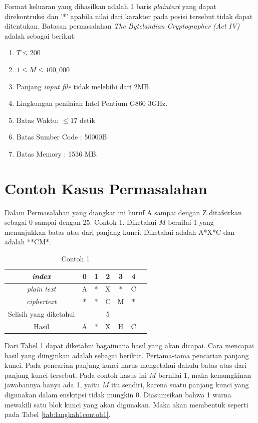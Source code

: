 	
	Format keluaran yang dihasilkan adalah 1 baris \textit{plaintext} yang dapat direkontruksi dan '*' apabila nilai dari karakter pada posisi tersebut tidak dapat ditentukan. 
	Batasan permasalahan \textit{The Bytelandian Cryptographer (Act IV)} adalah sebagai berikut:
	\begin{enumerate}
		\item $T \leq 200$
		\item $1 \leq M \leq 100,000$
		\item Panjang \textit{input file} tidak melebihi dari 2MB.
		\item Lingkungan penilaian Intel Pentium G860 3GHz.
		\item Batas Waktu: $\leq17$ detik
		\item Batas Sumber Code : 50000B
		\item Batas Memory : 1536 MB.                 
	\end{enumerate}

	\section{Contoh Kasus Permasalahan}
	Dalam Permasalahan yang diangkat ini huruf A sampai dengan Z ditafsirkan sebagai 0 sampai dengan 25.
	Contoh 1. Diketahui $M$ bernilai 1 yang menunjukkan batas atas dari panjang kunci. Diketahui \plaintext adalah A*X*C dan \ciphertext adalah **CM*. 
	\begin{table}[H]
	 	\centering
		\caption{Contoh 1}	 	
	 	\begin{tabular}{|c|c|c|c|c|c|c|}\hline
	 	\textit{index}&0&1&2&3&4\\ \hline
	 	\textit{plain text}&A&*&X&*&C\\ \hline
	 	\textit{ciphertext}&*&*&C&M&*\\ \hline
	 	Selisih yang diketahui& & &5& & \\ \hline
	 	Hasil              &A&*&X&H&C\\ \hline
	 	\end{tabular}
	 	\label{tab:contoh1}
	\end{table}
	 
	 Dari Tabel \ref{tab:contoh1} dapat diketahui bagaimana hasil yang akan dicapai. Cara mencapai hasil yang diinginkan adalah sebagai berikut. Pertama-tama pencarian panjang kunci. Pada pencarian panjang kunci harus mengetahui dahulu batas atas dari panjang kunci tersebut. Pada contoh kasus ini $M$ bernilai 1, maka kemungkinan jawabannya hanya ada 1, yaitu $M$ itu sendiri, karena suatu panjang kunci yang digunakan dalam enskripsi tidak mungkin 0. Diasumsikan bahwa 1 warna mewakili satu blok kunci yang akan digunakan. Maka akan membentuk seperti pada Tabel \ref{tab:langkah1contoh1}.
	 
